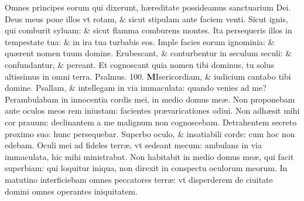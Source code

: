 \documentclass[a5paper,10pt]{book}
\def\ae{æ}
\begin{document}
\begin{multicols*}{2}
\newline \color{red} O\color{black}mnes principes eorum qui dixerunt, h\ae reditate possideamus sanctuarium Dei.
\newline \color{red} D\color{black}eus meus pone illos vt rotam, \& sicut stipulam ante faciem venti.
\newline \color{red} S\color{black}icut ignis, qui comburit syluam: \& sicut flamma comburens montes.
\newline \color{red} I\color{black}ta persequeris illos in tempestate tua: \& in ira tua turbabis eos.
\newline \color{red} I\color{black}mple facies eorum ignominia: \& qu\ae rent nomen tuum domine.
\newline \color{red} E\color{black}rubescant, \& conturbentur in seculum seculi: \& confundantur, \& pereant.
\newline \color{red} E\color{black}t cognoscant quia nomen tibi dominus, tu solus altissimus in omni terra.
\newline \color{red} Psalmus. \hypertarget{ps100}{100.} \color{black}
\lettrine[lines=2]{\bfseries \color{red} M}{}Isericordiam, \& iudicium cantabo tibi domine.
\newline \color{red} P\color{black}sallam, \& intellegam in via immaculata: quando venies ad me?
\newline \color{red} P\color{black}erambulabam in innocentia cordis mei, in medio domus me\ae .
\newline \color{red} N\color{black}on proponebam ante oculos meos rem iniustam: facientes pr\ae varicationes odiui.
\newline \color{red} N\color{black}on adh\ae sit mihi cor prauum: declinantem a me malignum non cognoscebam.
\newline \color{red} D\color{black}etrahentem secreto proximo suo: hunc persequebar.
\newline \color{red} S\color{black}uperbo oculo, \& insatiabili corde: cum hoc non edebam.
\newline \color{red} O\color{black}culi mei ad fideles terr\ae , vt sedeant mecum: ambulans in via immaculata, hic mihi ministrabat.
\newline \color{red} N\color{black}on habitabit in medio domus me\ae , qui facit superbiam: qui loquitur iniqua, non direxit in conspectu oculorum meorum.
\newline \color{red} I\color{black}n matutino interficiebam omnes peccatores terr\ae : vt disperderem de ciuitate domini omnes operantes iniquitatem.

\end{multicols*}
\end{document}
